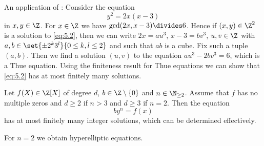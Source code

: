 An application of :
Consider the equation 
\begin{equation}\label{eq:5.2}
	y^2 = 2x(x-3)
\end{equation}
in \( x,y \in \Z \).
For \( x \in \Z \) we have \( \gcd(2x, x-3) \divides 6 \).
Hence if \( (x,y) \in \Z^2 \) is a solution to \eqref{eq:5.2}, then we can write \( 2x = au^3 \), \( x-3 = bv^3 \), \( u, v \in \Z \) with \( a,b \in \set{\pm 2^k3^l}{0 \leq k,l \leq 2} \) and such that \( ab \) is a cube.
Fix such a tuple \( (a,b) \).
Then we find a solution \( (u,v) \) to the equation \( au^3 - 2bv^3 = 6 \), which is a Thue equation.
Using the finiteness result for Thue equations we can show that \eqref{eq:5.2} has at most finitely many solutions.

\begin{thm*}[Baker, 1968]
	Let \( f(X) \in \Z[X] \) of degree \( d \), \( b \in \Z \setminus \{0\} \) and \( n \in \N_{\geq 2} \).
	Assume that \( f \) has no multiple zeros and \( d \geq 2 \) if \( n > 3 \) and \( d \geq 3 \) if \( n = 2 \).
	Then the equation
	\[ by^n = f(x) \]
	has at most finitely many integer solutions, which can be determined effectively.
\end{thm*}

\begin{rem*}
	For \( n = 2 \) we obtain hyperelliptic equations.
\end{rem*}